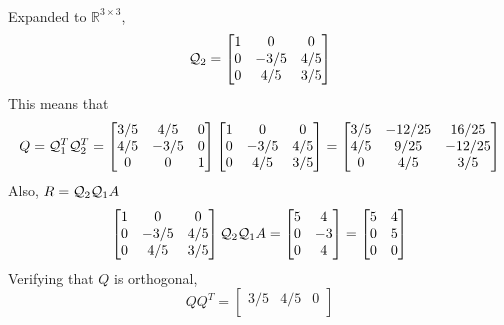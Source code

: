 \documentclass{article}
\newcommand{\rdim}[2]{\mathbb{R}^{#1 \times #2}}
\begin{document}
\begin{enumerate}
\begin{enumerate}
{\begin{align*}
      \end{align*}
      Expanded to $\rdim{3}{3}$, 
      \[\mathcal{Q}_2 = \begin{bmatrix} 1 & 0 & 0 \\ 0 & -3/5 & 4/5 \\
           0 & 4/5 & 3/5 \\ \end{bmatrix}\]
      This means that
      \[Q =  \mathcal{Q}_1^T \mathcal{Q}_2^T  = 
      \begin{bmatrix}
        3/5 & 4/5 & 0 \\
        4/5 & -3/5 & 0 \\
        0 & 0 & 1\\
      \end{bmatrix}
      \begin{bmatrix} 
        1 & 0 & 0 \\ 
        0 & -3/5 & 4/5 \\
        0 & 4/5 & 3/5 \\
      \end{bmatrix} =
      \begin{bmatrix} 
        3/5 & -12/25 & 16/25 \\ 
        4/5 & 9/25 & -12/25 \\
        0 & 4/5 & 3/5 \\
      \end{bmatrix}\] 
      Also, $R = \mathcal{Q}_2 \mathcal{Q}_1 A $
      \[
        \begin{bmatrix} 
          1 & 0 & 0 \\ 
          0 & -3/5 & 4/5 \\
          0 & 4/5 & 3/5 \\
        \end{bmatrix}
        \mathcal{Q}_2 \mathcal{Q}_1 A = 
        \begin{bmatrix}
            5 & 4 \\
            0 & -3 \\
            0 & 4 \\
        \end{bmatrix}
        =
        \begin{bmatrix}
            5 & 4 \\
            0 & 5 \\
            0 & 0 \\
        \end{bmatrix}
      \]
      Verifying that $Q$ is orthogonal,
      \[ QQ^T = 
      \begin{bmatrix}
        3/5 & 4/5 & 0 \\

\end{bmatrix}\]}
\end{enumerate}
\end{enumerate}
\end{document}
